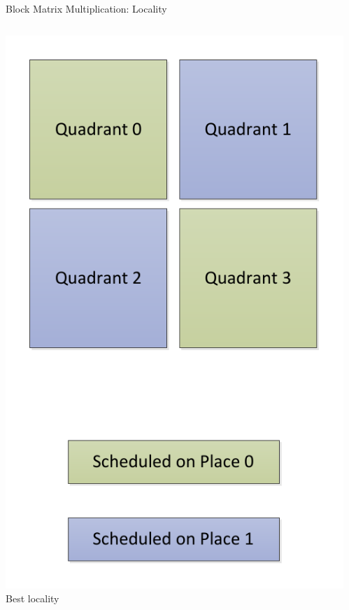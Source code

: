 \begin{frame}{Block Matrix Multiplication: Locality}
  \begin{columns}[c]
    \begin{column}{0.31\textwidth}
      \begin{center}
        \includegraphics[width=\linewidth]{figures/matmult-best-locality} \\
        \tiny{Best locality}
      \end{center}
    \end{column}
    \begin{column}{0.31\textwidth}
      \begin{center}

\end{center}
\end{column}
\end{columns}
\end{frame}
